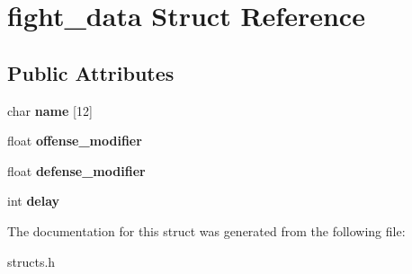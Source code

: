\hypertarget{structfight__data}{\section{fight\-\_\-data Struct Reference}
\label{structfight__data}
}
\subsection*{Public Attributes}
\begin{DoxyCompactItemize}
\item 
\hypertarget{structfight__data_a7071040701ede70c5947846c68f5b3a8}{char {\bfseries name} \mbox{[}12\mbox{]}}\label{structfight__data_a7071040701ede70c5947846c68f5b3a8}

\item 
\hypertarget{structfight__data_aa869c12593bab69ec208893f05e3bd22}{float {\bfseries offense\-\_\-modifier}}\label{structfight__data_aa869c12593bab69ec208893f05e3bd22}

\item 
\hypertarget{structfight__data_adce563612a39d6998338a71465f17b52}{float {\bfseries defense\-\_\-modifier}}\label{structfight__data_adce563612a39d6998338a71465f17b52}

\item 
\hypertarget{structfight__data_a666282af0f07ad22d980f4cd441415e5}{int {\bfseries delay}}\label{structfight__data_a666282af0f07ad22d980f4cd441415e5}

\end{DoxyCompactItemize}


The documentation for this struct was generated from the following file\-:\begin{DoxyCompactItemize}
\item 
structs.\-h\end{DoxyCompactItemize}
